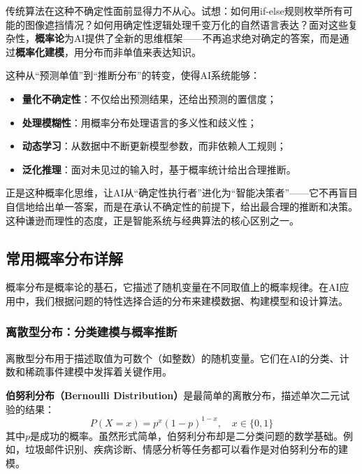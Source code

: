 传统算法在这种不确定性面前显得力不从心。试想：如何用if-else规则枚举所有可能的图像遮挡情况？如何用确定性逻辑处理千变万化的自然语言表达？面对这些复杂性，\textbf{概率论}为AI提供了全新的思维框架——不再追求绝对确定的答案，而是通过\textbf{概率化建模}，用分布而非单值来表达知识。

这种从``预测单值''到``推断分布''的转变，使得AI系统能够：
\begin{itemize}
  \item \textbf{量化不确定性}：不仅给出预测结果，还给出预测的置信度；
  \item \textbf{处理模糊性}：用概率分布处理语言的多义性和歧义性；
  \item \textbf{动态学习}：从数据中不断更新模型参数，而非依赖人工规则；
  \item \textbf{泛化推理}：面对未见过的输入时，基于概率统计给出合理推断。
\end{itemize}

正是这种概率化思维，让AI从``确定性执行者''进化为``智能决策者''——它不再盲目自信地给出单一答案，而是在承认不确定性的前提下，给出最合理的推断和决策。这种谦逊而理性的态度，正是智能系统与经典算法的核心区别之一。%

\subsection{常用概率分布详解}

概率分布是概率论的基石，它描述了随机变量在不同取值上的概率规律。在AI应用中，我们根据问题的特性选择合适的分布来建模数据、构建模型和设计算法。

\subsubsection{离散型分布：分类建模与概率推断}

离散型分布用于描述取值为可数个（如整数）的随机变量。它们在AI的分类、计数和稀疏事件建模中发挥着关键作用。

\textbf{伯努利分布（Bernoulli Distribution）}是最简单的离散分布，描述单次二元试验的结果：
\begin{equation}
P(X=x) = p^x(1-p)^{1-x}, \quad x \in \{0, 1\}
\end{equation}
其中$p$是成功的概率。虽然形式简单，伯努利分布却是二分类问题的数学基础。例如，垃圾邮件识别、疾病诊断、情感分析等任务都可以看作是对伯努利分布的建模。


